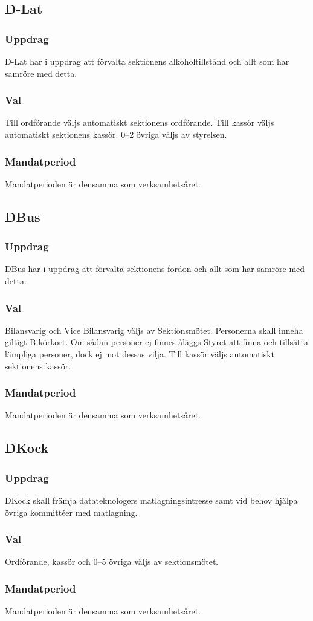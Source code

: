\subsection{D-Lat}
\subsubsection{Uppdrag} 
D-Lat har i uppdrag att förvalta sektionens alkoholtillstånd och allt som har samröre med detta.
\subsubsection{Val}
Till ordförande väljs automatiskt sektionens ordförande. Till kassör väljs automatiskt sektionens kassör. 0--2 övriga väljs av styrelsen.
\subsubsection{Mandatperiod}
Mandatperioden är densamma som verksamhetsåret.

\subsection{DBus}
\subsubsection{Uppdrag}
DBus har i uppdrag att förvalta sektionens fordon och allt som har samröre med detta.
\subsubsection{Val}
Bilansvarig och Vice Bilansvarig väljs av Sektionsmötet. Personerna skall inneha giltigt B-körkort. Om sådan personer ej finnes åläggs Styret att finna och tillsätta lämpliga personer, dock ej mot dessas vilja. Till kassör väljs automatiskt sektionens kassör.
\subsubsection{Mandatperiod}
Mandatperioden är densamma som verksamhetsåret.





\subsection{DKock}
\subsubsection{Uppdrag}
DKock skall främja datateknologers matlagningsintresse samt vid behov hjälpa övriga kommittéer med matlagning.
\subsubsection{Val}
Ordförande, kassör och 0--5 övriga väljs av sektionsmötet.
\subsubsection{Mandatperiod}
Mandatperioden är densamma som verksamhetsåret.

\newpage
